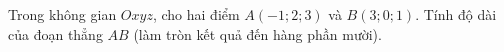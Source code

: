 \begin{ex}
Trong không gian $Oxyz$, cho hai điểm $A(-1;2;3)$ và $B(3;0;1)$. Tính độ dài của đoạn thẳng $AB$ (làm tròn kết quả đến hàng phần mười).
\end{ex}
